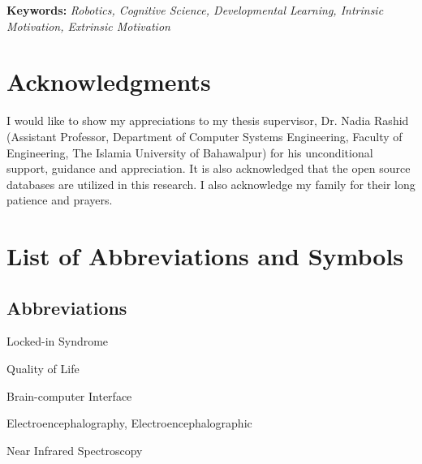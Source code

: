 \documentclass[11pt,a4paper]{report}
\numberwithin{equation}{section}
\newcommand{\acrolabel}[1]{\makebox[3cm][l]{\textbf{#1}}}
\newenvironment{acronyms}{\begin{list}{}{\renewcommand{\makelabel}{\acrolabel}}}{\end{list}}
\begin{document}
    \textbf{Keywords:} \textit{Robotics, Cognitive Science, Developmental Learning, Intrinsic Motivation, Extrinsic Motivation}

    \newpage
    \chapter*{Acknowledgments}
I would like to show my appreciations to my thesis supervisor, Dr. Nadia Rashid (Assistant Professor, Department of Computer Systems Engineering, Faculty of Engineering, The Islamia University of Bahawalpur) for his unconditional support, guidance and appreciation. It is also acknowledged that the open source databases are utilized in this research. I also acknowledge my family for their long patience and prayers.

    \newpage
    \tableofcontents

    \listoffigures
    \listoftables

    \newpage
    \chapter*{List of Abbreviations and Symbols}
    \section*{Abbreviations}
    \begin{acronyms}
    \item[LIS] Locked-in Syndrome
    \item[QoL] Quality of Life
    \item[BCI] Brain-computer Interface
    \item[EEG] Electroencephalography, Electroencephalographic
    \item[NIRS] Near Infrared Spectroscopy
    \end{acronyms}

    \newpage

    
    

    
\end{document}
